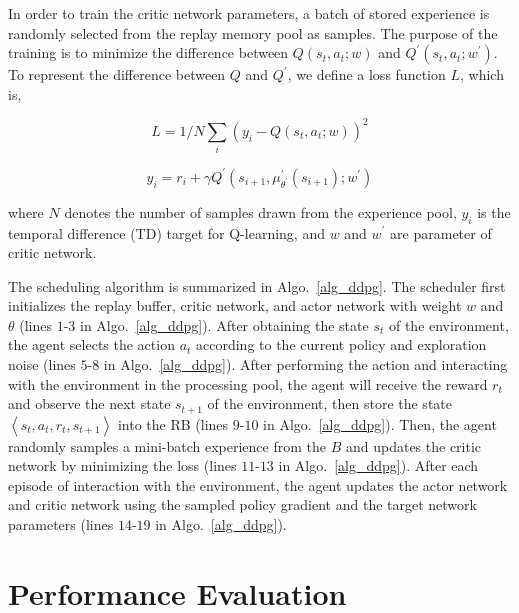 \documentclass[10pt, conference, letterpaper]{IEEEtran}
\begin{document}
In order to train the critic network parameters, a batch of stored experience is randomly selected from the replay memory pool as samples. The purpose of the training is to minimize the difference between $Q(s_t, a_t; w)$ and $Q^{\prime}(s_t, a_t; w^{\prime})$. To represent the difference between $Q$ and $Q^{\prime}$, we define a loss function $L$, which is,

\begin{equation}
    L = 1/N \sum_i (y_i - Q(s_t, a_t; w))^2
\end{equation}

\begin{equation}
    y_i = r_i + \gamma Q^{\prime}(s_{i+1}, \mu^{\prime}_{\theta^{\prime}} (s_{i+1}); w^{\prime})
\end{equation}

where $N$ denotes the number of samples drawn from the experience pool, $y_i$ is the temporal difference (TD) target for Q-learning, and $w$ and $w^{\prime}$ are parameter of critic network.

The scheduling algorithm is summarized in Algo.~\ref{alg_ddpg}. The scheduler first initializes the replay buffer, critic network, and actor network with weight $w$ and $\theta$ (lines $1$-$3$ in  Algo.~\ref{alg_ddpg}). After obtaining the state $s_t$ of the environment, the agent selects the action $a_t$ according to the current policy and exploration noise (lines $5$-$8$ in Algo.~\ref{alg_ddpg}). After performing the action and interacting with the environment in the processing pool, the agent will receive the reward $r_t$ and observe the next state $s_{t+1}$ of the environment, then store the state $\left<s_t, a_t, r_t, s_{t + 1}\right>$ into the RB (lines $9$-$10$ in Algo.~\ref{alg_ddpg}). Then, the agent randomly samples a mini-batch experience from the $B$ and updates the critic network by minimizing the loss (lines $11$-$13$ in Algo.~\ref{alg_ddpg}). After each episode of interaction with the environment, the agent updates the actor network and critic network using the sampled policy gradient and the target network parameters (lines $14$-$19$ in Algo.~\ref{alg_ddpg}). 

\section{Performance Evaluation}\label{sec:performance-evaluation}
\end{document}
